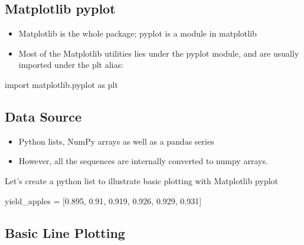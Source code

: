 \documentclass[
  letterpaper,
  DIV=11,
  numbers=noendperiod]{scrreprt}
\newenvironment{Shaded}{\begin{snugshade}}{\end{snugshade}}
\newcommand{\FloatTok}[1]{\textcolor[rgb]{0.68,0.00,0.00}{#1}}
\newcommand{\ImportTok}[1]{\textcolor[rgb]{0.00,0.46,0.62}{#1}}
\newcommand{\NormalTok}[1]{\textcolor[rgb]{0.00,0.23,0.31}{#1}}
\newcommand{\OperatorTok}[1]{\textcolor[rgb]{0.37,0.37,0.37}{#1}}
\providecommand{\tightlist}{%
  \setlength{\itemsep}{0pt}\setlength{\parskip}{0pt}}\usepackage{longtable,booktabs,array}
\begin{document}
\hypertarget{matplotlib-pyplot}{%
\subsection{Matplotlib pyplot}\label{matplotlib-pyplot}}

\begin{itemize}
\tightlist
\item
  Matplotlib is the whole package; pyplot is a module in matplotlib
\item
  Most of the Matplotlib utilities lies under the pyplot module, and are
  usually imported under the plt alias:
\end{itemize}

\begin{Shaded}
\begin{Highlighting}[]
\ImportTok{import}\NormalTok{ matplotlib.pyplot }\ImportTok{as}\NormalTok{ plt}
\end{Highlighting}
\end{Shaded}

\hypertarget{data-source}{%
\subsection{Data Source}\label{data-source}}

\begin{itemize}
\tightlist
\item
  Python lists, NumPy arrays as well as a pandas series
\item
  However, all the sequences are internally converted to numpy arrays.
\end{itemize}

Let's create a python list to illustrate basic plotting with Matplotlib
pyplot

\begin{Shaded}
\begin{Highlighting}[]
\NormalTok{yield\_apples }\OperatorTok{=}\NormalTok{ [}\FloatTok{0.895}\NormalTok{, }\FloatTok{0.91}\NormalTok{, }\FloatTok{0.919}\NormalTok{, }\FloatTok{0.926}\NormalTok{, }\FloatTok{0.929}\NormalTok{, }\FloatTok{0.931}\NormalTok{]}
\end{Highlighting}
\end{Shaded}

\hypertarget{basic-line-plotting}{%
\subsection{Basic Line Plotting}\label{basic-line-plotting}}
\end{document}
